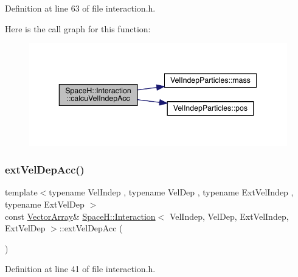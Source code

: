 Definition at line 63 of file interaction.\+h.

Here is the call graph for this function\+:\nopagebreak
\begin{figure}[H]
\begin{center}
\leavevmode
\includegraphics[width=343pt]{class_space_h_1_1_interaction_a675bfa4741648047ff36592e08a62c32_cgraph}
\end{center}
\end{figure}
\mbox{\label{class_space_h_1_1_interaction_a15494ade2b2d4e9c972718bbcf40dd4d}} 
\subsubsection{\texorpdfstring{ext\+Vel\+Dep\+Acc()}{extVelDepAcc()}\hspace{0.1cm}{\footnotesize\ttfamily [1/2]}}
{\footnotesize\ttfamily template$<$typename Vel\+Indep , typename Vel\+Dep , typename Ext\+Vel\+Indep , typename Ext\+Vel\+Dep $>$ \\
const \mbox{\hyperlink{class_space_h_1_1_interaction_a9aaccf9a34d875881d9448acf7aaf009}{Vector\+Array}}\& \mbox{\hyperlink{class_space_h_1_1_interaction}{Space\+H\+::\+Interaction}}$<$ Vel\+Indep, Vel\+Dep, Ext\+Vel\+Indep, Ext\+Vel\+Dep $>$\+::ext\+Vel\+Dep\+Acc (\begin{DoxyParamCaption}{ }\end{DoxyParamCaption})\hspace{0.3cm}{\ttfamily [inline]}}



Definition at line 41 of file interaction.\+h.

\mbox{\label{class_space_h_1_1_interaction_af1b751e13fc15bb66677fcf9459e95a0}} 
